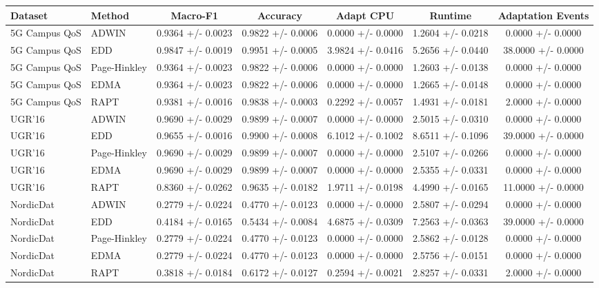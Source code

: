 \begin{tabular}{llccccc}
\toprule
Dataset & Method & Macro-F1 & Accuracy & Adapt CPU & Runtime & Adaptation Events \\
\midrule
5G Campus QoS & ADWIN & 0.9364 +/- 0.0023 & 0.9822 +/- 0.0006 & 0.0000 +/- 0.0000 & 1.2604 +/- 0.0218 & 0.0000 +/- 0.0000 \\
5G Campus QoS & EDD & 0.9847 +/- 0.0019 & 0.9951 +/- 0.0005 & 3.9824 +/- 0.0416 & 5.2656 +/- 0.0440 & 38.0000 +/- 0.0000 \\
5G Campus QoS & Page-Hinkley & 0.9364 +/- 0.0023 & 0.9822 +/- 0.0006 & 0.0000 +/- 0.0000 & 1.2603 +/- 0.0138 & 0.0000 +/- 0.0000 \\
5G Campus QoS & EDMA & 0.9364 +/- 0.0023 & 0.9822 +/- 0.0006 & 0.0000 +/- 0.0000 & 1.2665 +/- 0.0148 & 0.0000 +/- 0.0000 \\
5G Campus QoS & RAPT & 0.9381 +/- 0.0016 & 0.9838 +/- 0.0003 & 0.2292 +/- 0.0057 & 1.4931 +/- 0.0181 & 2.0000 +/- 0.0000 \\
UGR'16 & ADWIN & 0.9690 +/- 0.0029 & 0.9899 +/- 0.0007 & 0.0000 +/- 0.0000 & 2.5015 +/- 0.0310 & 0.0000 +/- 0.0000 \\
UGR'16 & EDD & 0.9655 +/- 0.0016 & 0.9900 +/- 0.0008 & 6.1012 +/- 0.1002 & 8.6511 +/- 0.1096 & 39.0000 +/- 0.0000 \\
UGR'16 & Page-Hinkley & 0.9690 +/- 0.0029 & 0.9899 +/- 0.0007 & 0.0000 +/- 0.0000 & 2.5107 +/- 0.0266 & 0.0000 +/- 0.0000 \\
UGR'16 & EDMA & 0.9690 +/- 0.0029 & 0.9899 +/- 0.0007 & 0.0000 +/- 0.0000 & 2.5355 +/- 0.0331 & 0.0000 +/- 0.0000 \\
UGR'16 & RAPT & 0.8360 +/- 0.0262 & 0.9635 +/- 0.0182 & 1.9711 +/- 0.0198 & 4.4990 +/- 0.0165 & 11.0000 +/- 0.0000 \\
NordicDat & ADWIN & 0.2779 +/- 0.0224 & 0.4770 +/- 0.0123 & 0.0000 +/- 0.0000 & 2.5807 +/- 0.0294 & 0.0000 +/- 0.0000 \\
NordicDat & EDD & 0.4184 +/- 0.0165 & 0.5434 +/- 0.0084 & 4.6875 +/- 0.0309 & 7.2563 +/- 0.0363 & 39.0000 +/- 0.0000 \\
NordicDat & Page-Hinkley & 0.2779 +/- 0.0224 & 0.4770 +/- 0.0123 & 0.0000 +/- 0.0000 & 2.5862 +/- 0.0128 & 0.0000 +/- 0.0000 \\
NordicDat & EDMA & 0.2779 +/- 0.0224 & 0.4770 +/- 0.0123 & 0.0000 +/- 0.0000 & 2.5756 +/- 0.0151 & 0.0000 +/- 0.0000 \\
NordicDat & RAPT & 0.3818 +/- 0.0184 & 0.6172 +/- 0.0127 & 0.2594 +/- 0.0021 & 2.8257 +/- 0.0331 & 2.0000 +/- 0.0000 \\
\bottomrule
\end{tabular}

